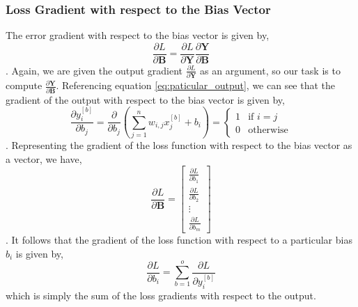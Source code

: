 \documentclass[11pt]{article}
\theoremstyle{definition}
\begin{document}
\subsubsection{Loss Gradient with respect to the Bias Vector}
The error gradient with respect to the bias vector is given by,
\begin{equation}
    \frac{\partial L}{\partial \mathbf{B}} = \frac{\partial L}{\partial \mathbf{Y}} \frac{\partial \mathbf{Y}}{\partial \mathbf{B}}
\end{equation}
. Again, we are given the output gradient $\frac{\partial L}{\partial \mathbf{Y}}$ as 
an argument, so our task is to compute $\frac{\partial \mathbf{Y}}{\partial \mathbf{B}}$.
Referencing equation \ref{eq:paticular_output}, we can see that the gradient of the 
output with respect to the bias vector is given by,
\begin{equation}
    \frac{\partial y^{[b]}_i}{\partial b_j} = \frac{\partial}{\partial b_j} \left( \sum_{j=1}^{n} w_{i,j} x_j^{[b]} + b_i \right) = 
    \begin{cases}
        1 & \text{if } i = j \\
        0 & \text{otherwise}
    \end{cases}
\end{equation}
. Representing the gradient of the loss function with respect to the bias vector as a 
vector, we have,
\begin{equation}
    \frac{\partial L}{\partial \mathbf{B}} = 
    \begin{bmatrix}
        \frac{\partial L}{\partial b_1} \\[0.5em]
        \frac{\partial L}{\partial b_2} \\[0.5em]
        \vdots \\[0.5em]
        \frac{\partial L}{\partial b_m}
    \end{bmatrix}
\end{equation}
. It follows that the gradient of the loss function with respect to a particular bias 
$b_i$ is given by,
\begin{equation}
    \frac{\partial L}{\partial b_i} = \sum_{b=1}^{o} \frac{\partial L}{\partial y^{[b]}_i}
\end{equation}
which is simply the sum of the loss gradients with respect to the output.
\end{document}
